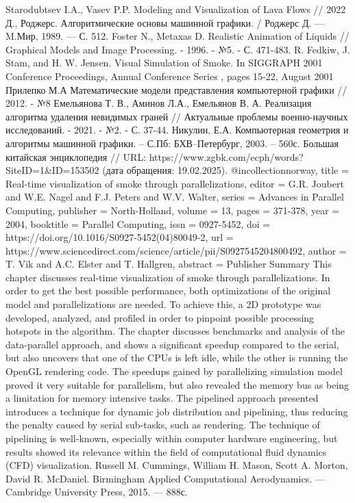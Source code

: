 \begin{thebibliography}{}
	 Starodubtsev I.A., Vasev P.P. Modeling and Visualization of Lava Flows // 2022
	 Д., Роджерс. Алгоритмические основы машинной графики. / Роджерс Д.
	— M.Мир, 1989. — С. 512. 
	 Foster N., Metaxas D. Realistic Animation of Liquids // Graphical Models and Image Processing. - 1996. - №5. - С. 471-483.
	R. Fedkiw, J. Stam, and H. W. Jensen. Visual Simulation of Smoke. In SIGGRAPH 2001 Conference Proceedings, Annual Conference Series , pages 15-22, August 2001
	 Прилепко М.А Математические модели представления компьютерной графики // 2012. - №8
	 Емельянова Т. В., Аминов Л.А., Емельянов В. А. Реализация алгоритма удаления невидимых граней // Актуальные проблемы военно-научных исследований. - 2021. - №2. - С. 37-44.
	 Никулин, Е.А. Компьютерная геометрия и алгоритмы машинной
	графики. – С.Пб: БХВ–Петербург, 2003. – 560с. 
	 Большая китайская энциклопедия // URL: https://www.zgbk.com/ecph/words?SiteID=1\&ID=153502 (дата обращения: 19.02.2025).
	@incollection{norway,
		title = {Real-time visualization of smoke through parallelizations},
		editor = {G.R. Joubert and W.E. Nagel and F.J. Peters and W.V. Walter},
		series = {Advances in Parallel Computing},
		publisher = {North-Holland},
		volume = {13},
		pages = {371-378},
		year = {2004},
		booktitle = {Parallel Computing},
		issn = {0927-5452},
		doi = {https://doi.org/10.1016/S0927-5452(04)80049-2},
		url = {https://www.sciencedirect.com/science/article/pii/S0927545204800492},
		author = {T. Vik and A.C. Elster and T. Hallgren},
		abstract = {Publisher Summary
			This chapter discusses real-time visualization of smoke through parallelizations. In order to get the best possible performance, both optimizations of the original model and parallelizations are needed. To achieve this, a 2D prototype was developed, analyzed, and profiled in order to pinpoint possible processing hotspots in the algorithm. The chapter discusses benchmarks and analysis of the data-parallel approach, and shows a significant speedup compared to the serial, but also uncovers that one of the CPUs is left idle, while the other is running the OpenGL rendering code. The speedups gained by parallelizing simulation model proved it very suitable for parallelism, but also revealed the memory bus as being a limitation for memory intensive tasks. The pipelined approach presented introduces a technique for dynamic job distribution and pipelining, thus reducing the penalty caused by serial sub-tasks, such as rendering. The technique of pipelining is well-known, especially within computer hardware engineering, but results showed its relevance within the field of computational fluid dynamics (CFD) visualization.}
	}
	 Russell M. Cummings, William H. Mason, Scott A. Morton, David R. McDaniel. Birmingham Applied Computational Aerodynamics. --- Cambridge University Press,  2015. --- 888с.
\end{thebibliography}
